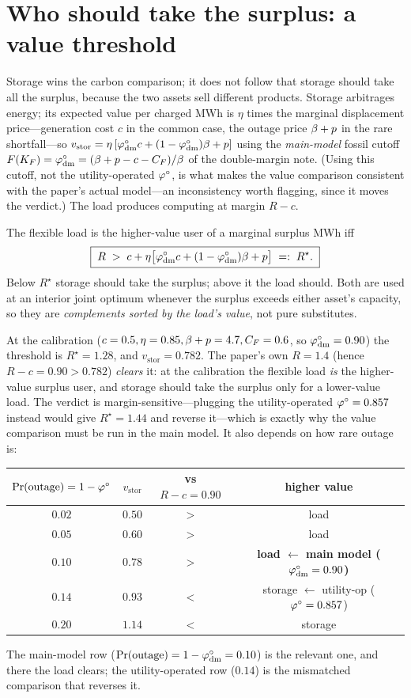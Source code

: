 \section{Who should take the surplus: a value threshold}
Storage wins the carbon comparison; it does not follow that storage should take all the
surplus, because the two assets sell different products. Storage arbitrages energy; its
expected value per charged MWh is $\eta$ times the marginal displacement price---generation
cost $c$ in the common case, the outage price $\beta+p$ in the rare shortfall---so
$v_{\mathrm{stor}}=\eta\,[\varphi^{\circ}_{\mathrm{dm}}c+(1-\varphi^{\circ}_{\mathrm{dm}})\beta+p]$ using the
\emph{main-model} fossil cutoff $F(K_F)=\varphi^{\circ}_{\mathrm{dm}}=(\beta+p-c-C_F)/\beta$ of the
double-margin note. (Using this cutoff, not the utility-operated $\varphi^{\circ}$, is what makes the
value comparison consistent with the paper's actual model---an inconsistency worth flagging,
since it moves the verdict.) The load produces computing at margin $R-c$.
\begin{proposition}
\label{st-prop:threshold}
The flexible load is the higher-value user of a marginal surplus MWh iff
\[
  \boxed{\;R \;>\; c+\eta\big[\varphi^{\circ}_{\mathrm{dm}}c+(1-\varphi^{\circ}_{\mathrm{dm}})\beta+p\big]\;=:\;R^{\star}.\;}
\]
Below $R^{\star}$ storage should take the surplus; above it the load should. Both are used at
an interior joint optimum whenever the surplus exceeds either asset's capacity, so they are
\emph{complements sorted by the load's value}, not pure substitutes.
\end{proposition}
At the calibration ($c=0.5,\eta=0.85,\beta+p=4.7,C_F=0.6$, so $\varphi^{\circ}_{\mathrm{dm}}=0.90$) the
threshold is $R^{\star}=1.28$, and $v_{\mathrm{stor}}=0.782$. The paper's own $R=1.4$
(hence $R-c=0.90>0.782$) \emph{clears} it: at the calibration the flexible load \emph{is} the
higher-value surplus user, and storage should take the surplus only for a lower-value load.
The verdict is margin-sensitive---plugging the utility-operated $\varphi^{\circ}=0.857$ instead would
give $R^{\star}=1.44$ and reverse it---which is exactly why the value comparison must be run
in the main model. It also depends on how rare outage is:
\begin{center}\small
\begin{tabular}{cccc}
\toprule
$\Pr(\text{outage})=1-\varphi^{\circ}$ & $v_{\mathrm{stor}}$ & vs $R-c=0.90$ & higher value\\
\midrule
$0.02$ & $0.50$ & $>$ & load\\
$0.05$ & $0.60$ & $>$ & load\\
$\mathbf{0.10}$ & $\mathbf{0.78}$ & $\mathbf{>}$ & \textbf{load $\leftarrow$ main model ($\varphi^{\circ}_{\mathrm{dm}}=0.90$)}\\
$0.14$ & $0.93$ & $<$ & storage $\leftarrow$ utility-op ($\varphi^{\circ}=0.857$)\\
$0.20$ & $1.14$ & $<$ & storage\\
\bottomrule
\end{tabular}
\end{center}
The main-model row ($\Pr(\text{outage})=1-\varphi^{\circ}_{\mathrm{dm}}=0.10$) is the relevant one, and
there the load clears; the utility-operated row ($0.14$) is the mismatched comparison that
reverses it.

